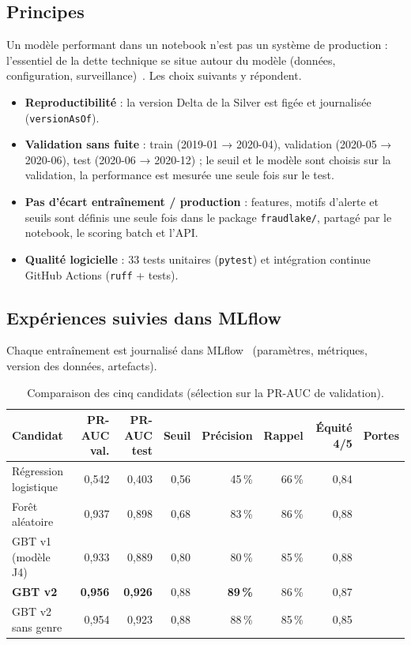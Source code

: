 \documentclass[11pt,a4paper]{article}
\newcommand{\code}[1]{\texttt{\small #1}}
\newcommand{\ok}{\textcolor{fl-green}{\ding{51}}}
\newcommand{\ko}{\textcolor{fl-orange}{\ding{55}}}
\begin{document}
\subsection{Principes}
Un modèle performant dans un notebook n'est pas un système de production : l'essentiel de la dette technique se situe autour du
modèle (données, configuration, surveillance)~\cite{sculley2015}. Les choix suivants y répondent.
\begin{itemize}[leftmargin=*,itemsep=2pt]
  \item \textbf{Reproductibilité} : la version Delta de la Silver est figée et journalisée (\code{versionAsOf}).
  \item \textbf{Validation sans fuite} : train (2019-01 → 2020-04), validation (2020-05 → 2020-06), test (2020-06 → 2020-12) ; le seuil
        et le modèle sont choisis sur la validation, la performance est mesurée une seule fois sur le test.
  \item \textbf{Pas d'écart entraînement / production} : features, motifs d'alerte et seuils sont définis une seule fois dans le
        package \code{fraudlake/}, partagé par le notebook, le scoring batch et l'API.
  \item \textbf{Qualité logicielle} : 33 tests unitaires (\code{pytest}) et intégration continue GitHub Actions (\code{ruff} + tests).
\end{itemize}

\subsection{Expériences suivies dans MLflow}
Chaque entraînement est journalisé dans MLflow~\cite{zaharia2018} (paramètres, métriques, version des données, artefacts).
\begin{table}[H]
\centering\small
\begin{tabular}{@{}l r r r r r r r@{}}
\toprule
\textbf{Candidat} & \textbf{PR-AUC val.} & \textbf{PR-AUC test} & \textbf{Seuil} & \textbf{Précision} & \textbf{Rappel} & \textbf{Équité 4/5} & \textbf{Portes} \\ \midrule
Régression logistique & 0,542 & 0,403 & 0,56 & 45\,\% & 66\,\% & 0,84 & \ko \\
Forêt aléatoire & 0,937 & 0,898 & 0,68 & 83\,\% & 86\,\% & 0,88 & \ok \\
GBT v1 (modèle J4) & 0,933 & 0,889 & 0,80 & 80\,\% & 85\,\% & 0,88 & \ok \\
\rowcolor{fl-sand}\textbf{GBT v2} & \textbf{0,956} & \textbf{0,926} & 0,88 & \textbf{89\,\%} & 86\,\% & 0,87 & \ok \\
GBT v2 sans genre & 0,954 & 0,923 & 0,88 & 88\,\% & 85\,\% & 0,85 & \ok \\
\bottomrule
\end{tabular}
\caption{Comparaison des cinq candidats (sélection sur la PR-AUC de validation).}
\end{table}
\end{document}
